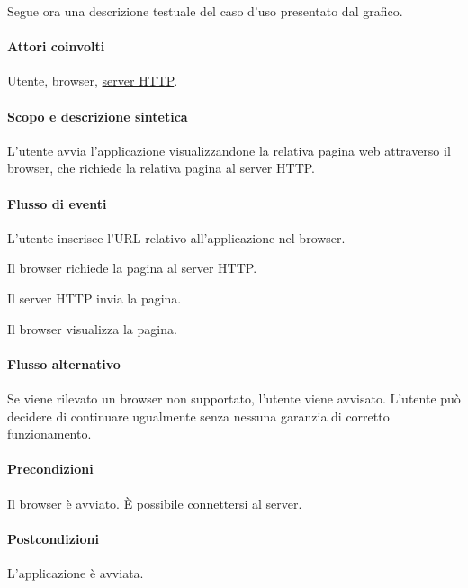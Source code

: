 Segue ora una descrizione testuale del caso d'uso presentato dal grafico.

\paragraph{Attori coinvolti} Utente, browser, {\underline{server HTTP}}.
\paragraph{Scopo e descrizione sintetica}
L'utente avvia l'applicazione visualizzandone la relativa pagina web attraverso il browser, che richiede la relativa pagina al server HTTP.
\paragraph{Flusso di eventi}
\begin{elenconumerato}[\textbf{}]{\subsubsecindent}
\item L'utente inserisce l'URL relativo all'applicazione nel browser.
\item Il browser richiede la pagina al server HTTP.
\item Il server HTTP invia la pagina.
\item Il browser visualizza la pagina.
\end{elenconumerato}
\paragraph{Flusso alternativo}
Se viene rilevato un browser non supportato, l'utente viene avvisato. L'utente pu\`o decidere di continuare ugualmente senza nessuna garanzia di corretto funzionamento.
\paragraph{Precondizioni} Il browser \`e avviato. \`E possibile connettersi al server.
\paragraph{Postcondizioni} L'applicazione \`e avviata.

